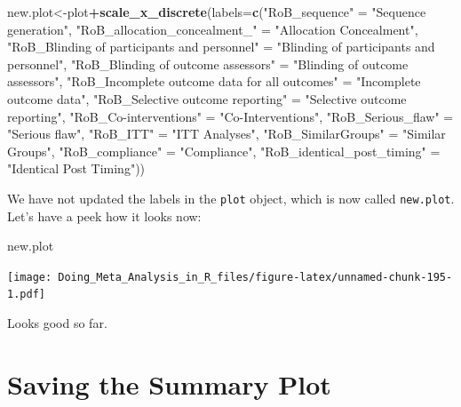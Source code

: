 \documentclass[]{book}
\newenvironment{Shaded}{\begin{snugshade}}{\end{snugshade}}
\newcommand{\DataTypeTok}[1]{\textcolor[rgb]{0.13,0.29,0.53}{#1}}
\newcommand{\KeywordTok}[1]{\textcolor[rgb]{0.13,0.29,0.53}{\textbf{#1}}}
\newcommand{\NormalTok}[1]{#1}
\newcommand{\OperatorTok}[1]{\textcolor[rgb]{0.81,0.36,0.00}{\textbf{#1}}}
\newcommand{\StringTok}[1]{\textcolor[rgb]{0.31,0.60,0.02}{#1}}
\begin{document}
\begin{Shaded}
\begin{Highlighting}[]
\NormalTok{new.plot<-plot}\OperatorTok{+}\KeywordTok{scale_x_discrete}\NormalTok{(}\DataTypeTok{labels=}\KeywordTok{c}\NormalTok{(}\StringTok{"RoB_sequence"}\NormalTok{ =}\StringTok{ "Sequence generation"}\NormalTok{,}
                            \StringTok{"RoB_allocation_concealment_"}\NormalTok{ =}\StringTok{ "Allocation Concealment"}\NormalTok{,}
                            \StringTok{"RoB_Blinding of participants and personnel"}\NormalTok{ =}\StringTok{ "Blinding of participants and personnel"}\NormalTok{,}
                            \StringTok{"RoB_Blinding of outcome assessors"}\NormalTok{ =}\StringTok{ "Blinding of outcome assessors"}\NormalTok{,}
                            \StringTok{"RoB_Incomplete outcome data for all outcomes"}\NormalTok{ =}\StringTok{ "Incomplete outcome data"}\NormalTok{,}
                            \StringTok{"RoB_Selective outcome reporting"}\NormalTok{ =}\StringTok{ "Selective outcome reporting"}\NormalTok{,}
                            \StringTok{"RoB_Co-interventions"}\NormalTok{ =}\StringTok{ "Co-Interventions"}\NormalTok{,}
                            \StringTok{"RoB_Serious_flaw"}\NormalTok{ =}\StringTok{ "Serious flaw"}\NormalTok{,}
                            \StringTok{"RoB_ITT"}\NormalTok{ =}\StringTok{ "ITT Analyses"}\NormalTok{,}
                            \StringTok{"RoB_SimilarGroups"}\NormalTok{ =}\StringTok{ "Similar Groups"}\NormalTok{,}
                            \StringTok{"RoB_compliance"}\NormalTok{ =}\StringTok{ "Compliance"}\NormalTok{,}
                            \StringTok{"RoB_identical_post_timing"}\NormalTok{ =}\StringTok{ "Identical Post Timing"}\NormalTok{))}
\end{Highlighting}
\end{Shaded}

We have not updated the labels in the \texttt{plot} object, which is now called \texttt{new.plot}. Let's have a peek how it looks now:

\begin{Shaded}
\begin{Highlighting}[]
\NormalTok{new.plot}
\end{Highlighting}
\end{Shaded}

\texttt{[image: Doing\_Meta\_Analysis\_in\_R\_files/figure-latex/unnamed-chunk-195-1.pdf]}

Looks good so far.

\hypertarget{saving}{%
\section{Saving the Summary Plot}\label{saving}}
\end{document}
